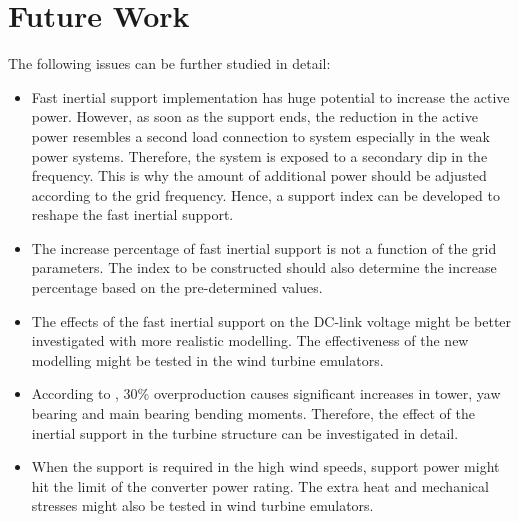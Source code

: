 \section{Future Work}
The following issues can be further studied in detail:
\begin{itemize}
	\item Fast inertial support implementation has huge potential to increase the active power. However, as soon as the support ends, the reduction in the active power resembles a second load connection to system especially in the weak power systems. Therefore, the system is exposed to a secondary dip in the frequency. This is why the amount of additional power should be adjusted according to the grid frequency. Hence, a support index can be developed to reshape the fast inertial support. 
	\item The increase percentage of fast inertial support is not a function of the grid parameters. The index to be constructed should also determine the increase percentage based on the pre-determined values. 
	\item The effects of the fast inertial support on the DC-link voltage might be better investigated with more realistic modelling. The effectiveness of the new modelling might be tested in the wind turbine emulators. 
	\item According to \cite{Altin2018}, 30\% overproduction causes significant increases in  tower, yaw bearing and main bearing bending moments. Therefore, the effect of the inertial support in the turbine structure can be investigated in detail. 
	\item When the support is required in the high wind speeds, support power might hit the limit of the converter power rating. The extra heat and mechanical stresses might also be tested in wind turbine emulators. 
\end{itemize}
